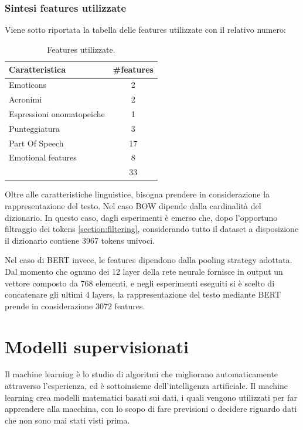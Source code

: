 \documentclass[oneside]{book}
\begin{document}
\subsection{Sintesi features utilizzate}
Viene sotto riportata la tabella delle features utilizzate con il relativo numero:

\begin{table}[h!]
	\centering
	\begin{tabular}[t]{l|c}
		\hline
		\textbf{Caratteristica} & \textbf{\#features} \\
		\hline
		Emoticons  			 & 2 \\
		Acronimi & 2 \\
		Espressioni onomatopeiche  & 1 \\
		Punteggiatura & 3 \\
		Part Of Speech & 17 \\
		Emotional features & 8 \\
		\hline
		& 33 \\
		
	\end{tabular}
	\caption{Features utilizzate.}
\end{table}

Oltre alle caratteristiche linguistice, bisogna prendere in considerazione la rappresentazione del testo. Nel caso BOW dipende dalla cardinalità del dizionario. In questo caso, dagli esperimenti è emerso che, dopo l'opportuno filtraggio dei tokens \ref{section:filtering}, considerando tutto il dataset a disposizione il dizionario contiene 3967 tokens univoci.

Nel caso di BERT invece, le features dipendono dalla pooling strategy adottata. Dal momento che ognuno dei 12 layer della rete neurale fornisce in output un vettore composto da 768 elementi, e negli esperimenti eseguiti si è scelto di concatenare gli ultimi 4 layers, la rappresentazione del testo mediante BERT prende in considerazione 3072 features.

\chapter{Modelli supervisionati}
\label{chap:supervised-models}

Il machine learning è lo studio di algoritmi che migliorano automaticamente attraverso l'esperienza, ed è sottoinsieme dell'intelligenza artificiale. Il machine learning crea modelli matematici basati sui dati, i quali vengono utilizzati per far apprendere alla macchina, con lo scopo di fare previsioni o decidere riguardo dati che non sono mai stati visti prima.
\end{document}
